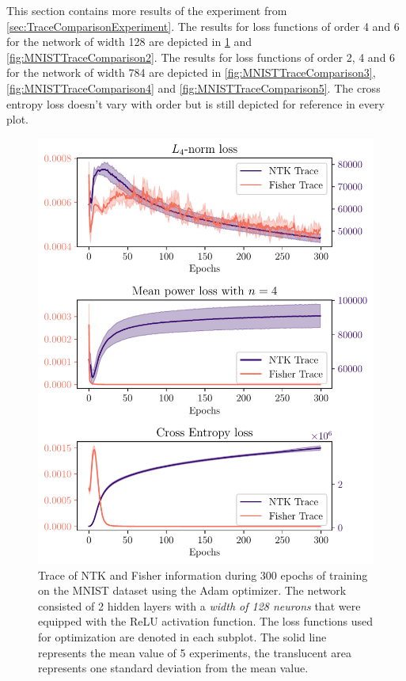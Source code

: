 This section contains more results of the experiment from \cref{sec:TraceComparisonExperiment}. The results for loss functions of order 4 and 6 for the network of width 128 are depicted in \cref{fig:MNISTTraceComparison1} and \cref{fig:MNISTTraceComparison2}. The results for loss functions of order 2, 4 and 6 for the network of width 784 are depicted in \cref{fig:MNISTTraceComparison3}, \cref{fig:MNISTTraceComparison4} and \cref{fig:MNISTTraceComparison5}. The cross entropy loss doesn't vary with order but is still depicted for reference in every plot.

\begin{figure}
	\centering
	\includegraphics{text/results/FisherNTKComparisonPlots/Triple_comparison_losses4_128.pdf}
	\caption{Trace of NTK and Fisher information during 300 epochs of training on the MNIST dataset using the Adam optimizer. The network consisted of 2 hidden layers with a \emph{width of 128 neurons} that were equipped with the ReLU activation function. The loss functions used for optimization are denoted in each subplot. The solid line represents the mean value of 5 experiments, the translucent area represents one standard deviation from the mean value.}
	\label{fig:MNISTTraceComparison1}
\end{figure}
